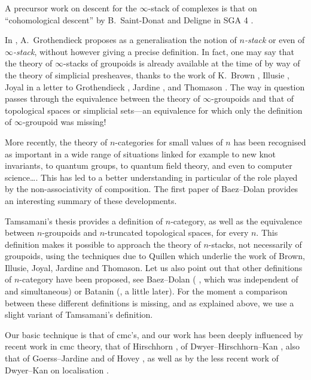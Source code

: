 A precursor work on descent for the $\infty$-stack of complexes is that on
``cohomological descent'' by B.~Saint-Donat and Deligne in SGA 4
\cite{SGA4b}.

In \cite{Grothendieck}, A.~Grothendieck proposes as a generalisation the
notion of \emph{$n$-stack} or even of \emph{$\infty$-stack}, without however
giving a precise definition. In fact, one may say that the theory of
$\infty$-stacks of groupoids is already available at the time of
\cite{Grothendieck} by way of the theory of simplicial presheaves, thanks to
the work of K.~Brown \cite{KBrown}, Illusie \cite{Illusie}, Joyal in a letter
to Grothendieck \cite{Joyal}, Jardine \cite{Jardine}, and Thomason
\cite{Thomason}. The way in question passes through the equivalence between
the theory of $\infty$-groupoids and that of topological spaces or simplicial
sets---an equivalence for which only the definition of $\infty$-groupoid was
missing!

More recently, the theory of $n$-categories for small values of $n$ has been
recognised as important in a wide range of situations linked for example to
new knot invariants, to quantum groups, to quantum field theory, and even to
computer science\ldots. This has led to a better understanding in particular
of the role played by the non-associativity of composition. The first paper
of Baez--Dolan \cite{BaezDolan} provides an interesting summary of these
developments.

Tamsamani's thesis \cite{Tamsamani} provides a definition of $n$-category, as
well as the equivalence between $n$-groupoids and $n$-truncated topological
spaces, for every $n$. This definition makes it possible to approach the
theory of $n$-stacks, not necessarily of groupoids, using the techniques due
to Quillen which underlie the work of Brown, Illusie, Joyal, Jardine and
Thomason. Let us also point out that other definitions of $n$-category have
been proposed, see Baez--Dolan (\cite{BaezDolanLetter} \cite{BaezDolanIII},
which was independent of \cite{Tamsamani} and simultaneous) or Batanin
(\cite{Batanin}, a little later). For the moment a comparison between these
different definitions is missing, and as explained above, we use a slight
variant of Tamsamani's definition.

Our basic technique is that of cmc's, and our work has been deeply influenced
by recent work in cmc theory, that of Hirschhorn \cite{Hirschhorn}, of
Dwyer--Hirschhorn--Kan \cite{DHK}, also that of Goerss--Jardine
\cite{JardineGoerssBook} and of Hovey \cite{HoveyMonMod} \cite{HoveyBook}, as
well as by the less recent work of Dwyer--Kan on localisation \cite{DwyerKan1}
\cite{DwyerKan2} \cite{DwyerKan3} \cite{DwyerKanDiags}.

